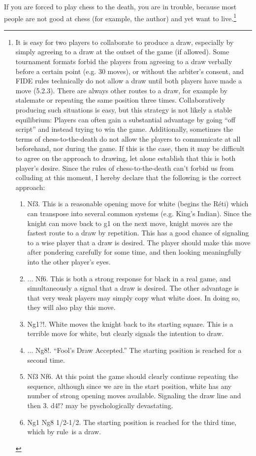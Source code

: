 \documentclass[twocolumn]{article}
\begin{document}
If you are forced to play chess to the death, you are in trouble,
because most people are not good at chess (for example, the author)
and yet want to live.\footnote{It is easy for two players to
  collaborate to produce a draw, especially by simply agreeing to a
  draw at the outset of the game (if allowed). Some tournament formats
  forbid the players from agreeing to a draw verbally before a certain
  point (e.g. 30 moves), or without the arbiter's consent, and FIDE
  rules technically do not allow a draw until both players have made a
  move (5.2.3). There are always other routes to a draw, for example
  by stalemate or repeating the same position three times.
  Collaboratively producing such situations is easy, but this strategy
  is not likely a stable equilibrium: Players can often gain a
  substantial advantage by going ``off script'' and instead trying to
  win the game. Additionally, sometimes the terms of
  chess-to-the-death do not allow the players to communicate at all
  beforehand, nor during the game. If this is the case, then it may be
  difficult to agree on the approach to drawing, let alone establish
  that this is both player's desire. Since the rules of
  chess-to-the-death can't forbid us from colluding at this moment, I
  hereby declare that the following is the correct approach:
\begin{enumerate}[label=\arabic*.]
  \item[1.] Nf3. This is a reasonable opening move for white (begins the R\'eti)
    which can transpose into several common systems (e.g. King's
    Indian). Since the knight can move back to g1 on the next move,
    knight moves are the fastest route to a draw by repetition. This
    has a good chance of signaling to a wise player that a draw is
    desired. The player should make this move after pondering carefully
    for some time, and then looking meaningfully into the other player's
    eyes. 
  \item[1.] ... Nf6. This is both a strong response for black in a real game,
    and simultaneously a signal that a draw is desired. The other
    advantage is that very weak players may simply copy what white does.
    In doing so, they will also play this move. 
  \item[2.] Ng1?!. White moves the knight back to its starting square.
    This is a terrible move for white, but clearly signals the intention to
    draw.
  \item[2.] ... Ng8!. ``Fool's Draw Accepted.'' The starting position is reached
    for a second time.
  \item[3.] Nf3 Nf6. At this point the game should clearly continue repeating
    the sequence, although since we are in the start position, white has
    any number of strong opening moves available. Signaling the draw line
    and then 3. d4!? may be pyschologically devastating.
  \item[4.] Ng1 Ng8 1/2-1/2. The starting position is reached for the third
    time, which by rule\footnotemark\ is a draw.
\end{enumerate}

}
\end{document}
